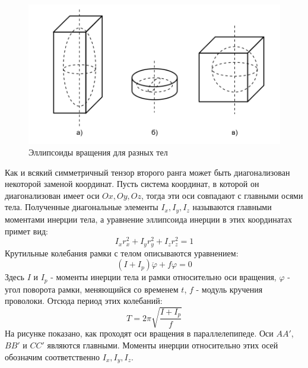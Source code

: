 \documentclass[a4paper, 12pt]{article}
\begin{document}
	\begin{figure}[H]
		\centering
		\includegraphics[scale = 0.5]{pictures/ellipsoid.png}
		\caption{Эллипсоиды вращения для разных тел}
	\end{figure}

	Как и всякий симметричный тензор второго ранга может быть диагонализован некоторой заменой координат.
	Пусть система координат, в которой он диагонализован имеет оси $Ox,Oy,Oz$, тогда эти оси совпадают с главными осями тела.
	Полученные диагональные элементы $I_{x}, I_{y}, I_{z}$ называются главными моментами инерции тела, а уравнение эллипсоида
	 инерции в этих координатах примет вид:
	\begin{equation}
	    I_{x}r^{2}_{x}+I_{y}r^{2}_{y}+I_{z}r^{2}_{z} = 1
	\end{equation}
	Крутильные колебания рамки с телом описываются уравнением:
	\begin{equation}
	    (I + I_p)\ddot{\varphi} + f \varphi = 0
	\end{equation}
	Здесь $I$ и $I_{p}$ - моменты инерции тела и рамки относительно
	 оси вращения, $\varphi$ - угол поворота рамки, меняющийся со
	временем $t$, $f$ - модуль кручения проволоки. Отсюда период этих колебаний:
	\begin{equation}
	    T = 2\pi\sqrt{\frac{I+I_{p}}{f}}
	\end{equation}
	На рисунке показано, как проходят оси вращения в параллелепипеде.
	 Оси $AA'$, $BB'$ и $CC'$ являются главными. Моменты инерции относительно
	этих осей обозначим соответственно $I_{x}, I_{y}, I_{z}$.\\
\end{document}
